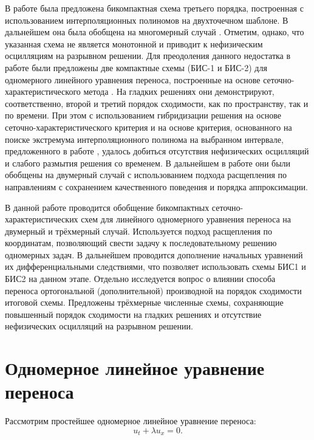 \documentclass[11pt]{article}
\begin{document}
В работе \cite{Yabe1991} была предложена бикомпактная \cite{Kalitkin2008} схема третьего порядка, построенная с использованием интерполяционных полиномов
на двухточечном шаблоне.
В дальнейшем она была обобщена на многомерный случай \cite{Yabe2004}.
Отметим, однако, что указанная схема не является монотонной и приводит к нефизическим осцилляциям на разрывном решении.
Для преодоления данного недостатка в работе \cite{Khokhlov1D2014} были предложены две компактные схемы (БИС-1 и БИС-2) для одномерного
линейного уравнения переноса, построенные на основе сеточно-характеристического метода \cite{Magometov-Kholodov-1969, Kholodov1990}.
На гладких решениях они демонстрируют, соответственно, второй и третий порядок сходимости, как по пространству, так и по времени.
При этом с использованием гибридизации решения \cite{petrov1984} на основе сеточно-характеристического критерия \cite{van1979} и на основе критерия,
основанного на поиске экстремума интерполяционного полинома на выбранном интервале, предложенного в работе \cite{Khokhlov1D2014},
удалось добиться отсутствия нефизических осцилляций и слабого размытия решения со временем.
В дальнейшем в работе \cite{Golubev2D2014} они были обобщены на двумерный случай с использованием подхода расщепления по направлениям с сохранением качественного поведения и порядка аппроксимации.

В данной работе проводится обобщение бикомпактных сеточно-характеристических схем для линейного одномерного уравнения переноса на двумерный и трёхмерный случай.
Используется подход расщепления по координатам, позволяющий свести задачу к последовательному решению одномерных задач.
В дальнейшем проводится дополнение начальных уравнений их дифференциальными следствиями, что позволяет использовать схемы БИС1 и БИС2 на данном этапе.
Отдельно исследуется вопрос о влиянии способа переноса ортогональной (дополнительной) производной на порядок сходимости итоговой схемы.
Предложены трёхмерные численные схемы, сохраняющие повышенный порядок сходимости на гладких решениях и отсутствие нефизических осцилляций на разрывном решении.

\section{Одномерное линейное уравнение переноса}

Рассмотрим простейшее одномерное линейное уравнение переноса:
\begin{equation}
\label{eq_advection}
u_t + \lambda u_x = 0.
\end{equation}
\end{document}
